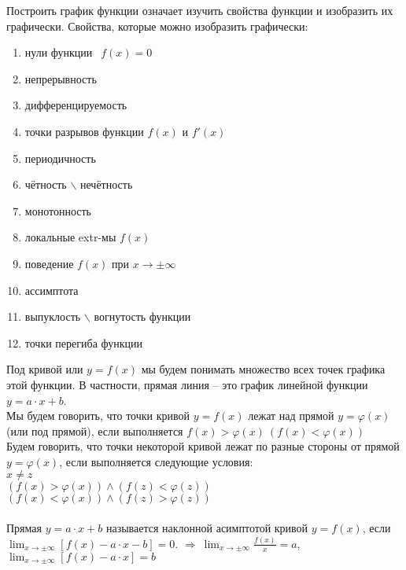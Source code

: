\documentclass{article}
\begin{document}

Построить график функции означает изучить свойства функции и изобразить их графически. Свойства, которые можно изобразить графически:
\begin{enumerate}
	\item нули функции $\ \  f(x) = 0$
	\item непрерывность
	\item дифференцируемость
	\item точки разрывов функции $f(x)$ и $f'(x)$
	\item периодичность
	\item чётность $\backslash$ нечётность
	\item монотонность
	\item локальные extr-мы $f(x)$
	\item поведение $f(x)$ при $x \to \pm \infty$
	\item ассимптота
	\item выпуклость $\backslash$ вогнутость функции
	\item точки перегиба функции
\end{enumerate}

Под кривой или $y = f(x)$ мы будем понимать множество всех точек графика этой функции. В частности, прямая линия -- это график линейной функции $y = a \cdot x + b$. \\
Мы будем говорить, что точки кривой $y = f(x)$ лежат над прямой $y = \varphi (x)$ (или под прямой), если выполняется $f(x) > \varphi (x) \ (f(x) < \varphi (x))$ \\

Будем говорить, что точки некоторой кривой лежат по разные стороны от прямой $y = \varphi (x)$, если выполняется следующие условия: \\
$x \ne z$ \\
$(f(x) > \varphi (x)) \wedge (f(z) < \varphi (z)) \quad$ \\
$(f(x) < \varphi (x)) \wedge (f(z) > \varphi (z))$ \\

 \\
Прямая $y = a \cdot x + b$ называется наклонной асимптотой кривой $y = f(x)$, если $\lim_{x \to \pm \infty} [f(x) - a \cdot x - b] = 0$.
$\Rightarrow \ \lim_{x \to \pm \infty} \frac{f(x)}{x} = a$, $\lim_{x \to \pm \infty} [f(x) - a \cdot x] = b$ \\
\end{document}
